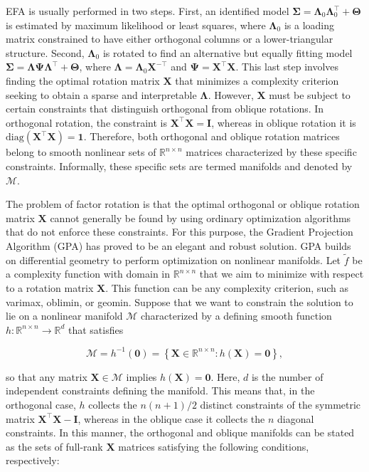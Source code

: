 \documentclass[
  12pt,
  letterpaper,
  article]{scrartcl}
\begin{document}
EFA is usually performed in two steps. First, an identified model
\(\mathbf{\Sigma} = \mathbf{\Lambda}_0\mathbf{\Lambda}_0^\top + \mathbf{\Theta}\)
is estimated by maximum likelihood or least squares, where
\(\mathbf{\Lambda}_0\) is a loading matrix constrained to have either
orthogonal columns or a lower-triangular structure. Second,
\(\mathbf{\Lambda}_0\) is rotated to find an alternative but equally
fitting model
\(\mathbf{\Sigma} = \mathbf{\Lambda}\mathbf{\Psi}\mathbf{\Lambda}^\top + \mathbf{\Theta}\),
where \(\mathbf{\Lambda} = \mathbf{\Lambda}_0\mathbf{X}^{-\top}\) and
\(\mathbf{\Psi} = \mathbf{X}^\top\mathbf{X}\). This last step involves
finding the optimal rotation matrix \(\mathbf{X}\) that minimizes a
complexity criterion seeking to obtain a sparse and interpretable
\(\mathbf{\Lambda}\). However, \(\mathbf{X}\) must be subject to certain
constraints that distinguish orthogonal from oblique rotations. In
orthogonal rotation, the constraint is
\(\mathbf{X}^\top\mathbf{X} = \mathbf{I}\), whereas in oblique rotation
it is \(\mathrm{diag}(\mathbf{X}^\top\mathbf{X}) = \mathbf{1}\).
Therefore, both orthogonal and oblique rotation matrices belong to
smooth nonlinear sets of \(\mathbb{R}^{n\times n}\) matrices
characterized by these specific constraints. Informally, these specific
sets are termed manifolds and denoted by \(\mathcal{M}\).

The problem of factor rotation is that the optimal orthogonal or oblique
rotation matrix \(\mathbf{X}\) cannot generally be found by using
ordinary optimization algorithms that do not enforce these constraints.
For this purpose, the Gradient Projection Algorithm (GPA) has proved to
be an elegant and robust solution. GPA builds on differential geometry
to perform optimization on nonlinear manifolds. Let \(\tilde{f}\) be a
complexity function with domain in \(\mathbb{R}^{n\times n}\) that we
aim to minimize with respect to a rotation matrix \(\mathbf{X}\). This
function can be any complexity criterion, such as varimax, oblimin, or
geomin. Suppose that we want to constrain the solution to lie on a
nonlinear manifold \(\mathcal{M}\) characterized by a defining smooth
function \(h:\mathbb{R}^{n\times n}\rightarrow\mathbb{R}^{d}\) that
satisfies

\[
\mathcal{M} = h^{-1}(\mathbf{0}) = \left\{ \mathbf{X}\in\mathbb{R}^{n\times n}: h(\mathbf{X})=\mathbf{0} \right\},
\]

so that any matrix \(\mathbf{X}\in\mathcal{M}\) implies
\(h(\mathbf{X})=\mathbf{0}\). Here, \(d\) is the number of independent
constraints defining the manifold. This means that, in the orthogonal
case, \(h\) collects the \(n(n+1)/2\) distinct constraints of the
symmetric matrix \(\mathbf{X}^\top\mathbf{X}-\mathbf{I}\), whereas in
the oblique case it collects the \(n\) diagonal constraints. In this
manner, the orthogonal and oblique manifolds can be stated as the sets
of full-rank \(\mathbf{X}\) matrices satisfying the following
conditions, respectively:
\end{document}
